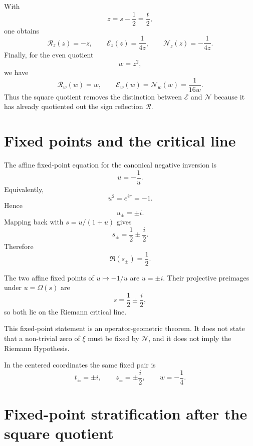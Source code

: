 With
\[
 z=s-\frac12=\frac t2,
\]
one obtains
\begin{equation}
 \boxed{\mathcal R_z(z)=-z},
 \qquad
 \boxed{\mathcal E_z(z)=\frac1{4z}},
 \qquad
 \boxed{\mathcal N_z(z)=-\frac1{4z}}.
 \label{eq:g012-z-actions}
\end{equation}
Finally, for the even quotient
\[
 w=z^2,
\]
we have
\begin{equation}
 \boxed{\mathcal R_w(w)=w},
 \qquad
 \boxed{\mathcal E_w(w)=\mathcal N_w(w)=\frac1{16w}}.
 \label{eq:g012-w-actions}
\end{equation}
Thus the square quotient removes the distinction between \(\mathcal E\) and
\(\mathcal N\) because it has already quotiented out the sign reflection
\(\mathcal R\).

\section{Fixed points and the critical line}

The affine fixed-point equation for the canonical negative inversion is
\[
 u=-\frac1u.
\]
Equivalently,
\begin{equation}
 \boxed{u^2=e^{i\pi}=-1}.
 \label{eq:g012-fixed-euler}
\end{equation}
Hence
\[
 \boxed{u_\pm=\pm i}.
\]
Mapping back with \(s=u/(1+u)\) gives
\begin{equation}
 \boxed{s_\pm=\frac12\pm\frac{i}{2}}.
 \label{eq:g012-fixed-s}
\end{equation}
Therefore
\[
 \boxed{\Re(s_\pm)=\frac12}.
\]

\begin{theorem}
The two affine fixed points of \(u\mapsto-1/u\) are \(u=\pm i\).  Their
projective preimages under \(u=\Omega(s)\) are
\[
 \boxed{s=\frac12\pm\frac{i}{2}},
\]
so both lie on the Riemann critical line.
\end{theorem}

\begin{warning}
This fixed-point statement is an operator-geometric theorem.  It does not state
that a non-trivial zero of \(\xi\) must be fixed by \(\mathcal N\), and it does
not imply the Riemann Hypothesis.
\end{warning}

In the centered coordinates the same fixed pair is
\[
 \boxed{t_\pm=\pm i},
 \qquad
 \boxed{z_\pm=\pm\frac{i}{2}},
 \qquad
 \boxed{w=-\frac14}.
\]

\section{Fixed-point stratification after the square quotient}

